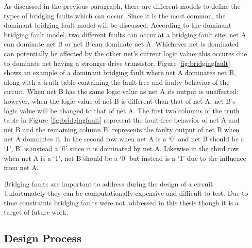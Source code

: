 \documentclass[12pt]{report}
\begin{document}
As discussed in the previous paragraph, there are different models to define the types of bridging faults which can occur.  Since it is the most common, the dominant bridging fault model will be discussed.  According to the dominant bridging fault model, two different faults can occur at a bridging fault site: net A can dominate net B or net B can dominate net A.  Whichever net is dominated can potentially be affected by the other net's current logic value; this occures due to dominate net having a stronger drive transistor\cite{needed-bridging}.  Figure \ref{fig:bridgingfault} shows an example of a dominant bridging fault where net A dominates net B, along with a truth table containing the fault-free and faulty behavior of the circuit.  When net B has the same logic value as net A its output is unaffected; however, when the logic value of net B is different than that of net A, net B's logic value will be changed to that of net A\cite{needed-bridging}.  The first two columns of the truth table in Figure \ref{fig:bridgingfault} represent the fault-free behavior of net A and net B and the remaining column B' represents the faulty output of net B when net A domaintes it. 
In the second row when net A is a `0' and net B should be a `1', B' is instead a `0' since it is dominated by net A.  Likewise in the third row when net A is a `1', net B should be a `0' but instead is a `1' due to the influence from net A.

Bridging faults are important to address during the design of a circuit.  Unfortunately they can be computationally expensive and difficult to test.  Due to time constraints bridging faults were not addressed in this thesis though it is a target of future work.

\subsection{Design Process}
\label{sct:designprocess}

\end{document}
